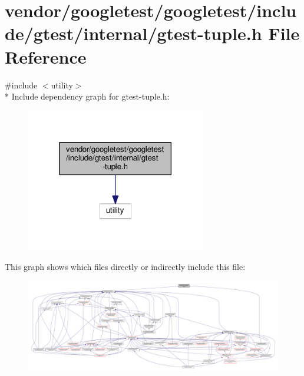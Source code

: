 \hypertarget{gtest-tuple_8h}{}\section{vendor/googletest/googletest/include/gtest/internal/gtest-\/tuple.h File Reference}
\label{gtest-tuple_8h}
{\ttfamily \#include $<$utility$>$}\\*
Include dependency graph for gtest-\/tuple.h\+:
\nopagebreak
\begin{figure}[H]
\begin{center}
\leavevmode
\includegraphics[width=222pt]{gtest-tuple_8h__incl}
\end{center}
\end{figure}
This graph shows which files directly or indirectly include this file\+:
\nopagebreak
\begin{figure}[H]
\begin{center}
\leavevmode
\includegraphics[width=350pt]{gtest-tuple_8h__dep__incl}
\end{center}
\end{figure}
